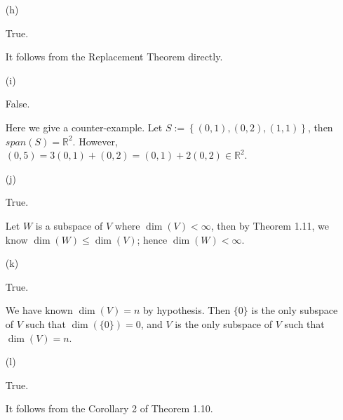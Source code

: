 \begin{Exercise}
\begin{enumerate}[(a)]
		\item[(h)]
		\begin{answer}
			True.
		\end{answer}
		\begin{solution}
			It follows from the Replacement Theorem directly.
		\end{solution}
		
		\item[(i)]
		\begin{answer}
			False.
		\end{answer}
		\begin{solution}
			Here we give a counter-example. Let $S := \left\{(0,1),(0,2),(1,1)\right\}$, then $span(S) = \mathbb{R}^2$. However, $(0,5) = 3(0,1)+(0,2) = (0,1)+2(0,2)\in\mathbb{R}^2$.
		\end{solution}
		
		\item[(j)]
		\begin{answer}
			True.
		\end{answer}
		\begin{solution}
			Let $W$ is a subspace of $V$ where $\dim(V) < \infty$, then by Theorem 1.11, we know $\dim(W)\leq \dim(V)$; hence $\dim(W) < \infty$.
		\end{solution}
		
		\item[(k)]
		\begin{answer}
			True.
		\end{answer}
		\begin{solution}
			We have known $\dim(V) = n$ by hypothesis. Then $\{0\}$ is the only subspace of $V$ such that $\dim(\{0\}) = 0$, and $V$ is the only subspace of $V$ such that $\dim(V) = n$.
		\end{solution}
		
		\item[(l)]
		\begin{answer}
			True.
		\end{answer}
		\begin{solution}
			It follows from the Corollary 2 of Theorem 1.10.
		\end{solution}
		
	\end{enumerate}
\end{Exercise}